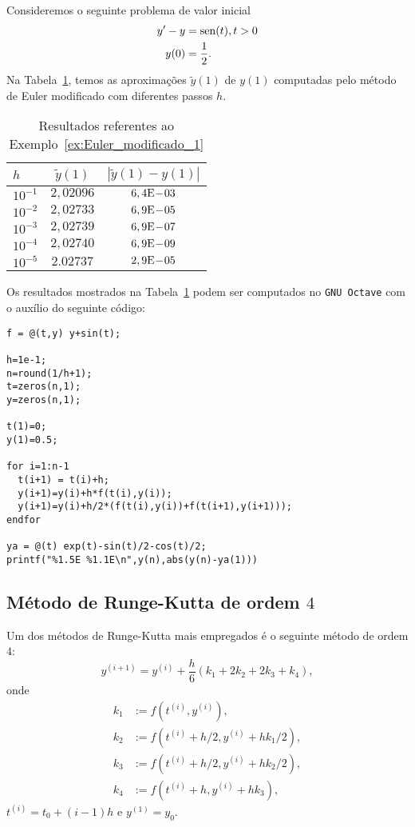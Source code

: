 \begin{ex}\label{ex:Euler_modificado_1}
  Consideremos o seguinte problema de valor inicial
  \begin{align}
    y' - y &= \operatorname{sen}(t), t>0\\
    y(0) &= \frac{1}{2}.
  \end{align}
  Na Tabela~\ref{tab:ex_Euler_modificado_1}, temos as aproximações $\tilde{y}(1)$ de $y(1)$ computadas pelo método de Euler modificado com diferentes passos $h$.
 
  \begin{table}[h!]
    \centering
    \begin{tabular}{l|cc}
      $h$ & $\tilde{y}(1)$ & $|\tilde{y}(1)-y(1)|$\\\hline
      $10^{-1}$ & $2,02096$ & $6,4\mathrm{E}\!-\!03$ \\
      $10^{-2}$ & $2,02733$ & $6,9\mathrm{E}\!-\!05$ \\
      $10^{-3}$ & $2,02739$ & $6,9\mathrm{E}\!-\!07$ \\
      $10^{-4}$ & $2,02740$ & $6,9\mathrm{E}\!-\!09$ \\
      $10^{-5}$ & $2.02737$ & $2,9\mathrm{E}\!-\!05$ \\\hline
    \end{tabular}
    \caption{Resultados referentes ao Exemplo~\ref{ex:Euler_modificado_1}}
    \label{tab:ex_Euler_modificado_1}
  \end{table}

\ifisoctave
Os resultados mostrados na Tabela~\ref{tab:ex_Euler_modificado_1} podem ser computados no \verb+GNU Octave+ com o auxílio do seguinte código:
\begin{verbatim}
f = @(t,y) y+sin(t);

h=1e-1;
n=round(1/h+1);
t=zeros(n,1);
y=zeros(n,1);

t(1)=0;
y(1)=0.5;

for i=1:n-1
  t(i+1) = t(i)+h;
  y(i+1)=y(i)+h*f(t(i),y(i));
  y(i+1)=y(i)+h/2*(f(t(i),y(i))+f(t(i+1),y(i+1)));
endfor

ya = @(t) exp(t)-sin(t)/2-cos(t)/2;
printf("%1.5E %1.1E\n",y(n),abs(y(n)-ya(1)))
\end{verbatim}
\fi
\end{ex}

\subsection{Método de Runge-Kutta de ordem $4$}

Um dos métodos de Runge-Kutta mais empregados é o seguinte método de ordem $4$:
\begin{equation}
  y^{(i+1)} = y^{(i)} + \frac{h}{6}(k_1 + 2k_2 + 2k_3 + k_4),
\end{equation}
onde
\begin{align}
  k_1 &:= f(t^{(i)},y^{(i)}),\\
  k_2 &:= f(t^{(i)}+h/2,y^{(i)}+hk_1/2),\\
  k_3 &:= f(t^{(i)}+h/2,y^{(i)}+hk_2/2),\\
  k_4 &:= f(t^{(i)}+h,y^{(i)}+hk_3),
\end{align}
$t^{(i)}=t_0+(i-1)h$ e $y^{(1)}=y_0$.

